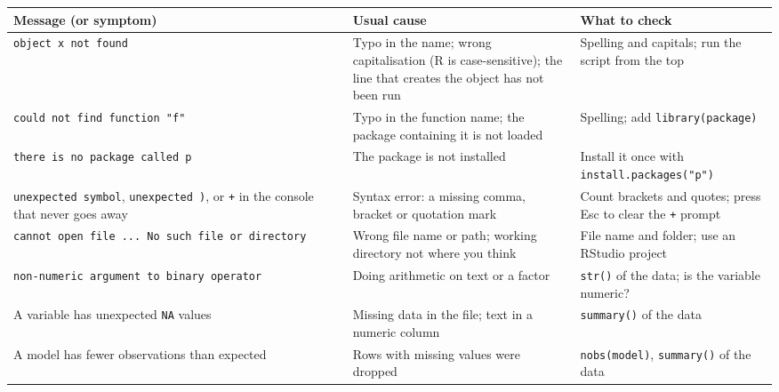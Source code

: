 \documentclass[
  letterpaper,
  8pt,
  a4paper]{book}
\newcounter{none} %
\begin{document}
{\def\LTcaptype{none} %
\begin{longtable}[]{@{}
  >{\raggedright\arraybackslash}p{}
  >{\raggedright\arraybackslash}p{}
  >{\raggedright\arraybackslash}p{}@{}}
\toprule\noalign{}
\begin{minipage}[b]{\linewidth}\raggedright
Message (or symptom)
\end{minipage} & \begin{minipage}[b]{\linewidth}\raggedright
Usual cause
\end{minipage} & \begin{minipage}[b]{\linewidth}\raggedright
What to check
\end{minipage} \\
\midrule\noalign{}
\endhead
\bottomrule\noalign{}
\endlastfoot
\texttt{object\ \textquotesingle{}x\textquotesingle{}\ not\ found} &
Typo in the name; wrong capitalisation (R is case-sensitive); the line
that creates the object has not been run & Spelling and capitals; run
the script from the top \\
\texttt{could\ not\ find\ function\ "f"} & Typo in the function name;
the package containing it is not loaded & Spelling; add
\texttt{library(package)} \\
\texttt{there\ is\ no\ package\ called\ \textquotesingle{}p\textquotesingle{}}
& The package is not installed & Install it once with
\texttt{install.packages("p")} \\
\texttt{unexpected\ symbol},
\texttt{unexpected\ \textquotesingle{})\textquotesingle{}}, or
\texttt{+} in the console that never goes away & Syntax error: a missing
comma, bracket or quotation mark & Count brackets and quotes; press Esc
to clear the \texttt{+} prompt \\
\texttt{cannot\ open\ file\ ...\ No\ such\ file\ or\ directory} & Wrong
file name or path; working directory not where you think & File name and
folder; use an RStudio project \\
\texttt{non-numeric\ argument\ to\ binary\ operator} & Doing arithmetic
on text or a factor & \texttt{str()} of the data; is the variable
numeric? \\
A variable has unexpected \texttt{NA} values & Missing data in the file;
text in a numeric column & \texttt{summary()} of the data \\
A model has fewer observations than expected & Rows with missing values
were dropped & \texttt{nobs(model)}, \texttt{summary()} of the data \\
\end{longtable}
}
\end{document}
